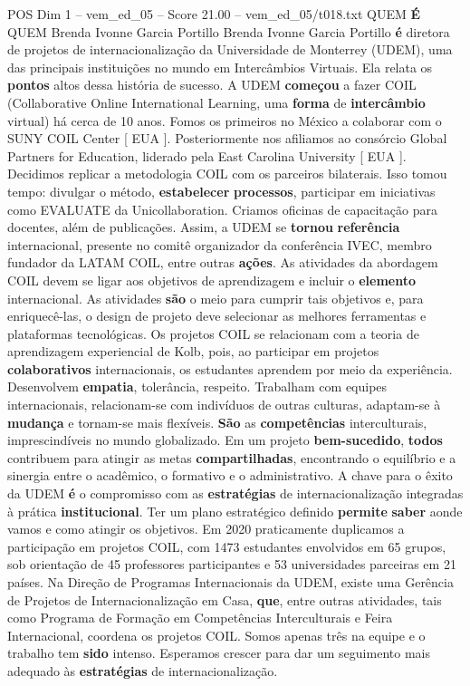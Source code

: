 \begin{textsample}{POS Dim 1 – vem\_ed\_05 – Score 21.00 – vem\_ed\_05/t018.txt}  \label{ex:f1_pos_102}
QUEM \textbf{É} QUEM Brenda Ivonne Garcia Portillo Brenda Ivonne Garcia Portillo \textbf{é} diretora de projetos de internacionalização da Universidade de Monterrey (UDEM), uma das principais instituições no mundo em Intercâmbios Virtuais.
Ela relata os \textbf{pontos} altos dessa história de sucesso.
A UDEM \textbf{começou} a fazer COIL (Collaborative Online International Learning, uma \textbf{forma} de \textbf{intercâmbio} virtual) há cerca de 10 anos.
Fomos os primeiros no México a colaborar com o SUNY COIL Center [ EUA ].
Posteriormente nos afiliamos ao consórcio Global Partners for Education, liderado pela East Carolina University [ EUA ].
Decidimos replicar a metodologia COIL com os parceiros bilaterais.
Isso tomou tempo: divulgar o método, \textbf{estabelecer} \textbf{processos}, participar em iniciativas como EVALUATE da Unicollaboration.
Criamos oficinas de capacitação para docentes, além de publicações.
Assim, a UDEM se \textbf{tornou} \textbf{referência} internacional, presente no comitê organizador da conferência IVEC, membro fundador da LATAM COIL, entre outras \textbf{ações}.
As atividades da abordagem COIL devem se ligar aos objetivos de aprendizagem e incluir o \textbf{elemento} internacional.
As atividades \textbf{são} o meio para cumprir tais objetivos e, para enriquecê-las, o design de projeto deve selecionar as melhores ferramentas e plataformas tecnológicas.
Os projetos COIL se relacionam com a teoria de aprendizagem experiencial de Kolb, pois, ao participar em projetos \textbf{colaborativos} internacionais, os estudantes aprendem por meio da experiência.
Desenvolvem \textbf{empatia}, tolerância, respeito.
Trabalham com equipes internacionais, relacionam-se com indivíduos de outras culturas, adaptam-se à \textbf{mudança} e tornam-se mais flexíveis. \textbf{São} as \textbf{competências} interculturais, imprescindíveis no mundo globalizado.
Em um projeto \textbf{bem-sucedido}, \textbf{todos} contribuem para atingir as metas \textbf{compartilhadas}, encontrando o equilíbrio e a sinergia entre o acadêmico, o formativo e o administrativo.
A chave para o êxito da UDEM \textbf{é} o compromisso com as \textbf{estratégias} de internacionalização integradas à prática \textbf{institucional}.
Ter um plano estratégico definido \textbf{permite} \textbf{saber} aonde vamos e como atingir os objetivos.
Em 2020 praticamente duplicamos a participação em projetos COIL, com 1473 estudantes envolvidos em 65 grupos, sob orientação de 45 professores participantes e 53 universidades parceiras em 21 países.
Na Direção de Programas Internacionais da UDEM, existe uma Gerência de Projetos de Internacionalização em Casa, \textbf{que}, entre outras atividades, tais como Programa de Formação em Competências Interculturais e Feira Internacional, coordena os projetos COIL.
Somos apenas três na equipe e o trabalho tem \textbf{sido} intenso.
Esperamos crescer para dar um seguimento mais adequado às \textbf{estratégias} de internacionalização.

\end{textsample}
